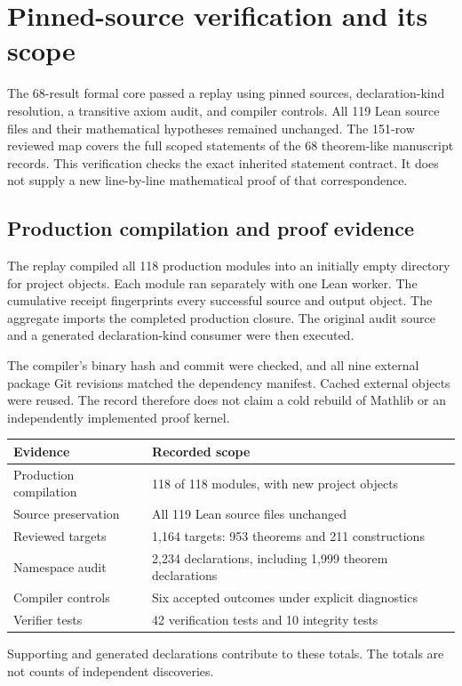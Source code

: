 \section{Pinned-source verification and its scope}
\label{sec:verification_scope}
The 68-result formal core passed a replay using pinned sources, declaration-kind resolution, a transitive axiom audit, and compiler controls. All 119 Lean source files and their mathematical hypotheses remained unchanged. The 151-row reviewed map covers the full scoped statements of the 68 theorem-like manuscript records. This verification checks the exact inherited statement contract. It does not supply a new line-by-line mathematical proof of that correspondence.

\subsection{Production compilation and proof evidence}
The replay compiled all 118 production modules into an initially empty directory for project objects. Each module ran separately with one Lean worker. The cumulative receipt fingerprints every successful source and output object. The aggregate imports the completed production closure. The original audit source and a generated declaration-kind consumer were then executed.

The compiler's binary hash and commit were checked, and all nine external package Git revisions matched the dependency manifest. Cached external objects were reused. The record therefore does not claim a cold rebuild of Mathlib or an independently implemented proof kernel.

\begin{longtable}{p{}p{}}
\toprule Evidence & Recorded scope \\ \midrule\endhead
Production compilation & 118 of 118 modules, with new project objects \\
Source preservation & All 119 Lean source files unchanged \\
Reviewed targets & 1,164 targets: 953 theorems and 211 constructions \\
Namespace audit & 2,234 declarations, including 1,999 theorem declarations \\
Compiler controls & Six accepted outcomes under explicit diagnostics \\
Verifier tests & 42 verification tests and 10 integrity tests \\
\bottomrule
\end{longtable}
Supporting and generated declarations contribute to these totals. The totals are not counts of independent discoveries.

